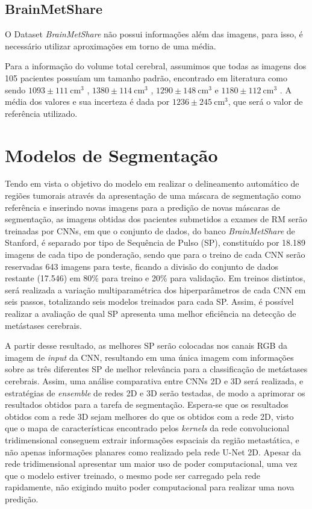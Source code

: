 \subsection{BrainMetShare}

O Dataset \textit{BrainMetShare} não possui informações além das imagens, para isso, é necessário utilizar aproximações em torno de uma média.

Para a informação do volume total cerebral, assumimos que todas as imagens dos 105 pacientes possuíam um tamanho padrão, encontrado em literatura como sendo $1093 \pm 111 \ \text{cm}^3$ \cite{Akeret:2021}, $1380 \pm 114 \ \text{cm}^3$ \cite{Filipek:1994}, $1290 \pm 148 \ \text{cm}^3$ \cite{Hammers:2003} e $1180 \pm 112 \ \text{cm}^3$ \cite{Lancaster:2010}. A média dos valores e sua incerteza é dada por 
$1236 \pm 245 \ \text{cm}^3$, que será o valor de referência utilizado. 

\section{Modelos de Segmentação}

Tendo em vista o objetivo do modelo em realizar o delineamento automático de regiões tumorais através da apresentação de uma máscara de segmentação como referência e inserindo novas imagens para a predição de novas máscaras de segmentação, as imagens obtidas dos pacientes submetidos a exames de RM serão treinadas por CNNs, em que o conjunto de dados, do banco \textit{BrainMetShare} de Stanford, é separado por tipo de Sequência de Pulso (SP), constituído por 18.189 imagens  de cada tipo de ponderação, sendo que para o treino de cada CNN serão reservadas 643 imagens para teste, ficando a divisão do conjunto de dados restante (17.546) em 80\% para treino e 20\% para validação. Em treinos distintos, será realizada a variação multiparamétrica dos hiperparâmetros de cada CNN em seis passos, totalizando seis modelos treinados para cada SP. Assim, é possível realizar a avaliação de qual SP apresenta uma melhor eficiência na detecção de metástases cerebrais.

A partir desse resultado, as melhores SP serão colocadas nos canais RGB da imagem de \textit{input} da CNN, resultando em uma única imagem com informações sobre as três diferentes SP de melhor relevância para a classificação de metástases cerebrais. Assim, uma análise comparativa entre CNNs 2D e 3D será realizada, e estratégias de \textit{ensemble} de redes 2D e 3D serão testadas, de modo a aprimorar os resultados obtidos para a tarefa de segmentação. Espera-se que os resultados obtidos com a rede 3D sejam melhores do que os obtidos com a rede 2D, visto que o mapa de características encontrado pelos \textit{kernels} da rede convolucional tridimensional conseguem extrair informações espaciais da região metastática, e não apenas informações planares como realizado pela rede U-Net 2D. Apesar da rede tridimensional apresentar um maior uso de poder computacional, uma vez que o modelo estiver treinado, o mesmo pode ser carregado pela rede rapidamente, não exigindo muito poder computacional para realizar uma nova predição.

